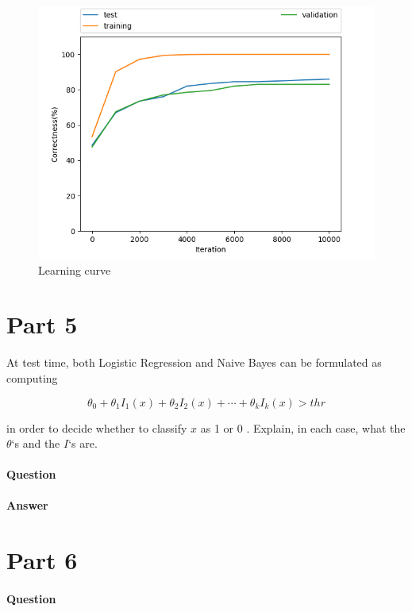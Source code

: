 \documentclass[11pt,twoside]{article}
\begin{document}
\begin{figure}[h]
	\centering
	\includegraphics[scale=0.8]{part4.png}
	\caption*{Learning curve}
\end{figure}

\clearpage

\section*{Part 5}
At test time, both Logistic Regression and Naive Bayes can be formulated as computing

\[\theta_0+\theta_1I_1(x)+\theta_2I_2(x)+\cdots+\theta_kI_k(x) > thr\]

in order to decide whether to classify $x$ as 1 or 0 . Explain, in each case, what the $\theta$‘s and the $I$‘s are.
\paragraph{Question}


\paragraph{Answer}

\clearpage

\section*{Part 6}
\paragraph{Question}
\end{document}
